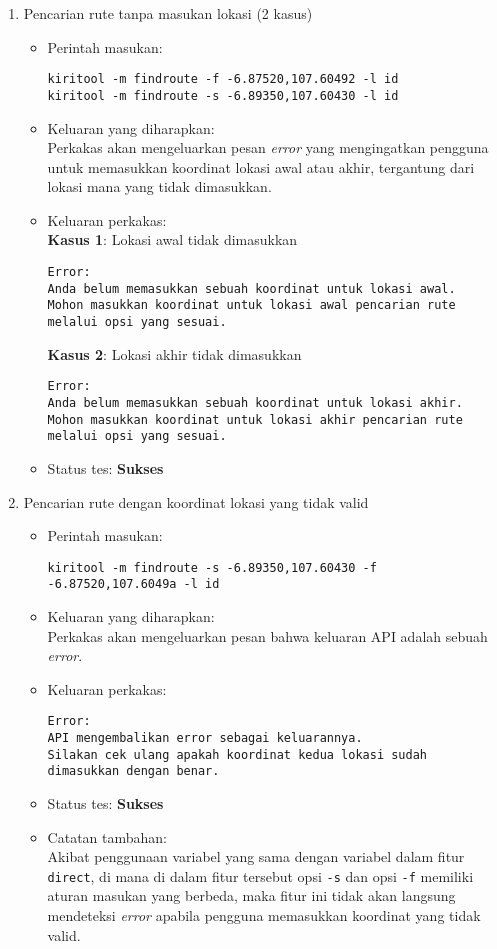 \begin{enumerate}
	\item Pencarian rute tanpa masukan lokasi (2 kasus)
	\begin{itemize}
		\item Perintah masukan:
		\begin{verbatim}
kiritool -m findroute -f -6.87520,107.60492 -l id
kiritool -m findroute -s -6.89350,107.60430 -l id
		\end{verbatim}
		\item Keluaran yang diharapkan: \\
		Perkakas akan mengeluarkan pesan \textit{error} yang mengingatkan pengguna untuk memasukkan koordinat \latlon lokasi awal atau akhir, tergantung dari lokasi mana yang tidak dimasukkan.
		\item Keluaran perkakas: \\
		\textbf{Kasus 1}: Lokasi awal tidak dimasukkan
		\begin{lstlisting}
Error:
Anda belum memasukkan sebuah koordinat untuk lokasi awal.
Mohon masukkan koordinat untuk lokasi awal pencarian rute melalui opsi yang sesuai.
		\end{lstlisting}
		\textbf{Kasus 2}: Lokasi akhir tidak dimasukkan
		\begin{lstlisting}
Error:
Anda belum memasukkan sebuah koordinat untuk lokasi akhir.
Mohon masukkan koordinat untuk lokasi akhir pencarian rute melalui opsi yang sesuai.
		\end{lstlisting}
		\item Status tes: \textbf{Sukses}
	\end{itemize}
	
	\item Pencarian rute dengan koordinat lokasi yang tidak valid
	\begin{itemize}
		\item Perintah masukan:
		\begin{verbatim}
kiritool -m findroute -s -6.89350,107.60430 -f -6.87520,107.6049a -l id
		\end{verbatim}
		\item Keluaran yang diharapkan: \\
		Perkakas akan mengeluarkan pesan bahwa keluaran API adalah sebuah \textit{error}.
		\item Keluaran perkakas:
		\begin{lstlisting}
Error:
API mengembalikan error sebagai keluarannya.
Silakan cek ulang apakah koordinat kedua lokasi sudah dimasukkan dengan benar.
		\end{lstlisting}
		\item Status tes: \textbf{Sukses}
		\item Catatan tambahan: \\
		Akibat penggunaan variabel yang sama dengan variabel dalam fitur \verb|direct|, di mana di dalam fitur tersebut opsi \verb|-s| dan opsi \verb|-f| memiliki aturan masukan yang berbeda, maka fitur ini tidak akan langsung mendeteksi \textit{error} apabila pengguna memasukkan koordinat yang tidak valid.
	\end{itemize}
	

\end{enumerate}
